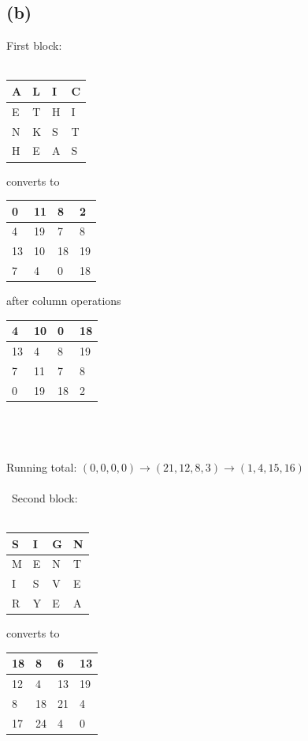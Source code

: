 \documentclass[a4paper]{article}
\begin{document}
\subsection*{(b)}
First block:\\\\
\begin{tabular}{|l|l|l|l|}
\hline
A & L & I & C \\ \hline
E & T & H & I \\ \hline
N & K & S & T \\ \hline
H & E & A & S \\ \hline
\end{tabular}
\quad
converts to 
\quad
\begin{tabular}{|l|l|l|l|}
\hline
0 & 11 & 8 & 2 \\ \hline
4 & 19 & 7 & 8 \\ \hline
13 & 10 & 18 &19 \\ \hline
7 & 4 & 0 & 18 \\ \hline
\end{tabular}
\quad
after column operations
\quad
\begin{tabular}{|l|l|l|l|}
\hline
4 & 10 & 0 & 18 \\ \hline
13 & 4 & 8 & 19 \\ \hline
7 & 11 & 7 &8 \\ \hline
0 & 19 & 18 & 2 \\ \hline
\end{tabular}
\\\\\\Running total: $(0, 0, 0, 0) \rightarrow (21, 12, 8, 3) \rightarrow (1, 4, 15, 16)$\\\\\
Second block:\\\\
\begin{tabular}{|l|l|l|l|}
\hline
S & I & G & N \\ \hline
M & E & N & T \\ \hline
I & S & V & E \\ \hline
R & Y & E & A \\ \hline
\end{tabular}
\quad
converts to 
\quad
\begin{tabular}{|l|l|l|l|}
\hline
18 & 8 & 6 & 13 \\ \hline
12 & 4 & 13 & 19 \\ \hline
8 & 18 & 21 &4 \\ \hline
17 & 24 & 4 & 0 \\ \hline
\end{tabular}
\end{document}
